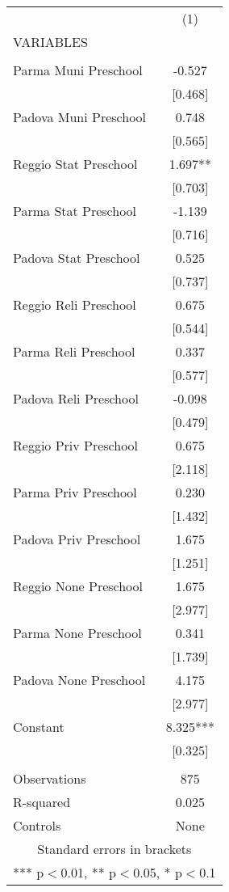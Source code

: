 \begin{tabular}{lc} \hline
 & (1) \\
VARIABLES &  \\ \hline
 &  \\
Parma Muni Preschool & -0.527 \\
 & [0.468] \\
Padova Muni Preschool & 0.748 \\
 & [0.565] \\
Reggio Stat Preschool & 1.697** \\
 & [0.703] \\
Parma Stat Preschool & -1.139 \\
 & [0.716] \\
Padova Stat Preschool & 0.525 \\
 & [0.737] \\
Reggio Reli Preschool & 0.675 \\
 & [0.544] \\
Parma Reli Preschool & 0.337 \\
 & [0.577] \\
Padova Reli Preschool & -0.098 \\
 & [0.479] \\
Reggio Priv Preschool & 0.675 \\
 & [2.118] \\
Parma Priv Preschool & 0.230 \\
 & [1.432] \\
Padova Priv Preschool & 1.675 \\
 & [1.251] \\
Reggio None Preschool & 1.675 \\
 & [2.977] \\
Parma None Preschool & 0.341 \\
 & [1.739] \\
Padova None Preschool & 4.175 \\
 & [2.977] \\
Constant & 8.325*** \\
 & [0.325] \\
 &  \\
Observations & 875 \\
R-squared & 0.025 \\
 Controls & None \\ \hline
\multicolumn{2}{c}{ Standard errors in brackets} \\
\multicolumn{2}{c}{ *** p$<$0.01, ** p$<$0.05, * p$<$0.1} \\
\end{tabular}
